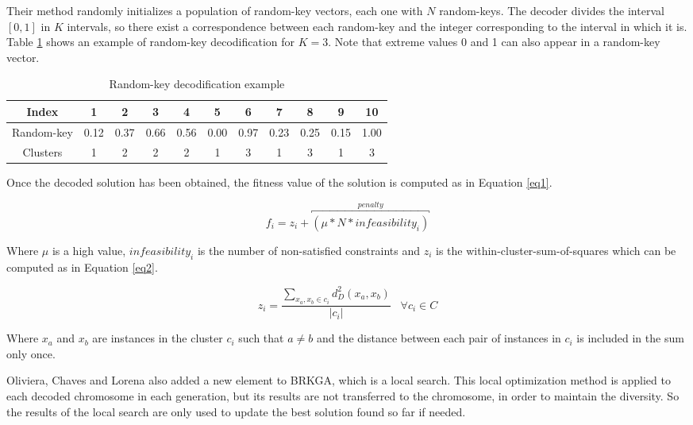 \documentclass[review]{elsarticle}
\begin{document}
Their method randomly initializes a population of random-key vectors, each one with $N$ random-keys. The decoder divides the interval $[0,1]$ in $K$ intervals, so there exist a correspondence between each random-key and the integer corresponding to the interval in which it is. Table \ref{tab:table1} shows an example of random-key decodification for $K = 3$. Note that extreme values 0 and 1 can also appear in a random-key vector.

\begin{table}[!h]
	\centering
	\setlength{\tabcolsep}{7pt}
	\renewcommand{\arraystretch}{0.9}
	
	\begin{tabular}{|c|c|c|c|c|c|c|c|c|c|c|}
		\hline
		Index & 1 & 2 & 3 & 4 & 5 & 6 & 7 & 8 & 9 & 10 \\ 
		\hline
		Random-key & 0.12 & 0.37 & 0.66 & 0.56 & 0.00 & 0.97 & 0.23 & 0.25 & 0.15 & 1.00 \\
		\hline
		Clusters & 1 & 2 & 2 & 2 & 1 & 3 & 1 & 3 & 1 & 3 \\ 
		\hline
		
	\end{tabular}
	\caption{Random-key decodification example \cite{de2017comparison}}
	\label{tab:table1}
\end{table}

Once the decoded solution has been obtained, the fitness value of the solution is computed as in Equation \eqref{eq1}.

\begin{equation}
f_i = z_i + \overbracket{(\mu * N * {infeasibility}_i)}^{penalty}
\label{eq1}
\end{equation}

Where $\mu$ is a high value, $infeasibility_i$ is the number of non-satisfied constraints and $z_i$ is the within-cluster-sum-of-squares which can be computed as in Equation \eqref{eq2}.

\begin{equation}
z_i = \frac{\sum_{x_a, x_b \in c_i} d_D^2(x_a,x_b)}{|c_i|} \;\;\; \forall c_i \in C
\label{eq2}
\end{equation}

Where $x_a$ and $x_b$ are instances in the cluster $c_i$ such that $a \neq b$ and the distance between each pair of instances in $c_i$ is included in the sum only once.

Oliviera, Chaves and Lorena also added a new element to BRKGA, which is a local search. This local optimization method is applied to each decoded chromosome in each generation, but its results are not transferred to the chromosome, in order to maintain the diversity. So the results of the local search are only used to update the best solution found so far if needed.
\end{document}
